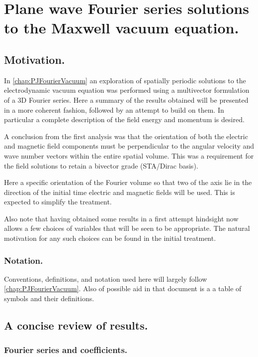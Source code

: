 \chapter{Plane wave Fourier series solutions to the Maxwell vacuum equation.}\label{chap:PJplaneWave}

\section{Motivation. }

In \ref{chap:PJFourierVacuum} an exploration of spatially periodic solutions to the electrodynamic vacuum equation was performed using a multivector formulation
of a 3D Fourier series.
Here a summary of the results obtained will be presented in a more
coherent fashion, followed by an attempt to build on them.
In particular a complete
description of the field energy and momentum is desired.

A conclusion from the first analysis was that the
orientation of both the electric and magnetic field components
must be perpendicular to the angular velocity and wave number vectors
within the entire spatial volume.  This was a requirement for the field
solutions to retain a bivector grade (STA/Dirac basis).

Here a specific orientation of the Fourier volume so that two of the axis
lie in the direction of the initial time electric and magnetic fields will be
used.  This is expected to simplify the treatment.

Also note that having obtained some results in a first attempt hindsight
now allows a few choices of variables that will be seen to be appropriate.
The natural motivation for any such choices can be found in the initial
treatment.

\subsection{Notation. }

Conventions, definitions, and notation used here will largely follow
\ref{chap:PJFourierVacuum}.  Also of possible aid in that document is a
a table of symbols and their definitions.

\section{A concise review of results. }

\subsection{Fourier series and coefficients. }

